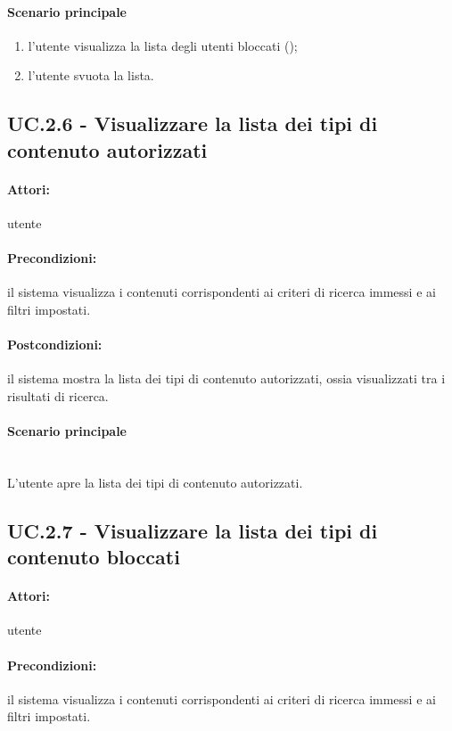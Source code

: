 \documentclass[10pt,a4paper,headinclude,footinclude,hidelinks]{scrreprt} %
\begin{document}
	\paragraph{Scenario principale}
	\begin{enumerate}
	\item l'utente visualizza la lista degli utenti bloccati ();
	\item l'utente svuota la lista.
	\end{enumerate}

	\subsection[UC.2.6]{UC.2.6 - Visualizzare la lista dei tipi di contenuto autorizzati}
	\label{sec:stage:ar:uc:2_6}
	\paragraph{Attori:} utente
	\paragraph{Precondizioni:} il sistema visualizza i contenuti corrispondenti ai criteri di ricerca immessi e ai filtri impostati.
	\paragraph{Postcondizioni:} il sistema mostra la lista dei tipi di contenuto autorizzati, ossia visualizzati tra i risultati di ricerca.
	\paragraph{Scenario principale} \hfill \\
	L'utente apre la lista dei tipi di contenuto autorizzati.

	\subsection[UC.2.7]{UC.2.7 - Visualizzare la lista dei tipi di contenuto bloccati}
	\label{sec:stage:ar:uc:2_7}
	\paragraph{Attori:} utente
	\paragraph{Precondizioni:} il sistema visualizza i contenuti corrispondenti ai criteri di ricerca immessi e ai filtri impostati.
\end{document}
